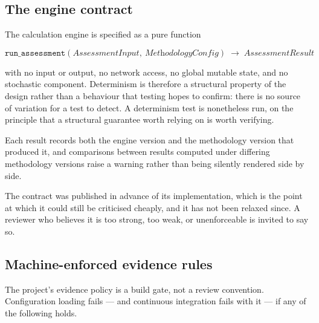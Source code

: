 \subsection{The engine contract}

The calculation engine is specified as a pure function

\[
\texttt{run\_assessment}(\textit{AssessmentInput},\ \textit{MethodologyConfig})
\;\longrightarrow\; \textit{AssessmentResult}
\]

with no input or output, no network access, no global mutable state, and no
stochastic component. Determinism is therefore a structural property of the
design rather than a behaviour that testing hopes to confirm: there is no
source of variation for a test to detect. A determinism test is nonetheless
run, on the principle that a structural guarantee worth relying on is worth
verifying.

Each result records both the engine version and the methodology version that
produced it, and comparisons between results computed under differing
methodology versions raise a warning rather than being silently rendered side
by side.

The contract was published in advance of its implementation, which is the point
at which it could still be criticised cheaply, and it has not been relaxed
since. A reviewer who believes it is too strong, too weak, or unenforceable is
invited to say so.

\subsection{Machine-enforced evidence rules}
\label{sec:evidence-rules}

The project's evidence policy is a build gate, not a review convention.
Configuration loading fails --- and continuous integration fails with it --- if
any of the following holds.

